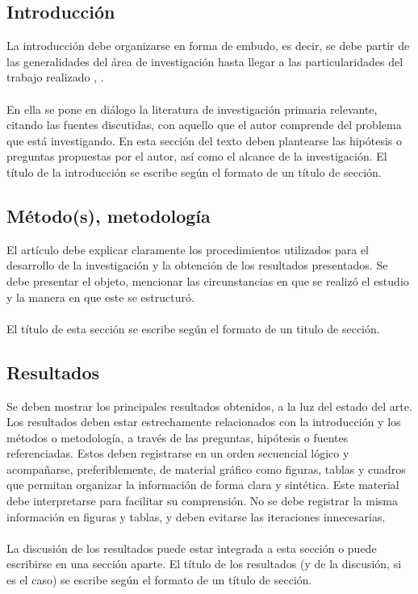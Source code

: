 \documentclass[10pt,letterpaper,twoside,twocolumn]{article}   %
\begin{document}
\subsection{Introducción}
La introducción debe organizarse en forma de embudo, es decir, se debe partir de las generalidades del área de investigación hasta llegar a las particularidades del trabajo realizado \cite{rico2011introduccion}, \cite{mejia2008pautas}.\\
\\
En ella se pone en diálogo la literatura de investigación primaria relevante, citando las fuentes discutidas, con aquello que el autor comprende del problema que está investigando. En esta sección del texto deben plantearse las hipótesis o preguntas propuestas por el autor, así como el alcance de la investigación. El título de la introducción se escribe según el formato de un título de sección.
\subsection{Método(s), metodología}
El artículo debe explicar claramente los procedimientos utilizados para el desarrollo de la investigación y la obtención de los resultados presentados. Se debe presentar el objeto, mencionar las circunstancias en que se realizó el estudio y la manera en que este se estructuró.\\
\\
El título de esta sección se escribe según el formato de un titulo de sección.
\subsection{Resultados}
Se deben mostrar los principales resultados obtenidos, a la luz del estado del arte. Los resultados deben estar estrechamente relacionados con la introducción y los métodos o metodología, a través de las preguntas,  hipótesis o fuentes referenciadas. Estos deben registrarse en un orden secuencial lógico y acompañarse, preferiblemente, de material gráfico como figuras, tablas y cuadros que permitan organizar la información de forma clara y sintética. Este material debe interpretarse para facilitar su comprensión. No se debe registrar la misma información en figuras y tablas, y deben evitarse las iteraciones innecesarias.\\
\\
La discusión de los resultados puede estar integrada a esta sección o puede escribirse en una sección aparte. El título de los resultados (y de la discusión, si es el caso) se escribe según el formato de un título de sección.
\end{document}
